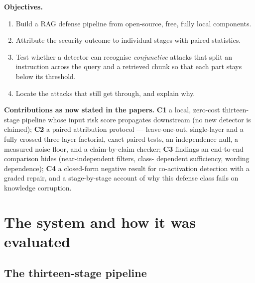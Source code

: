 \documentclass[11pt,a4paper]{article}
\begin{document}
\textbf{Objectives.}
\begin{enumerate}[label=(\roman*)]
\item Build a RAG defense pipeline from open-source, free, fully local components.
\item Attribute the security outcome to individual stages with paired statistics.
\item Test whether a detector can recognise \emph{conjunctive} attacks that split an instruction across the query
  and a retrieved chunk so that each part stays below its threshold.
\item Locate the attacks that still get through, and explain why.
\end{enumerate}

\textbf{Contributions as now stated in the papers.}
\textbf{C1} a local, zero-cost thirteen-stage pipeline whose input risk score propagates downstream (no new
detector is claimed); \textbf{C2} a paired attribution protocol --- leave-one-out, single-layer and a fully
crossed three-layer factorial, exact paired tests, an independence null, a measured noise floor, and a
claim-by-claim checker; \textbf{C3} findings an end-to-end comparison hides (near-independent filters, class-
dependent sufficiency, wording dependence); \textbf{C4} a closed-form negative result for co-activation detection
with a graded repair, and a stage-by-stage account of why this defense class fails on knowledge corruption.

\section{The system and how it was evaluated}

\subsection{The thirteen-stage pipeline}
\end{document}
